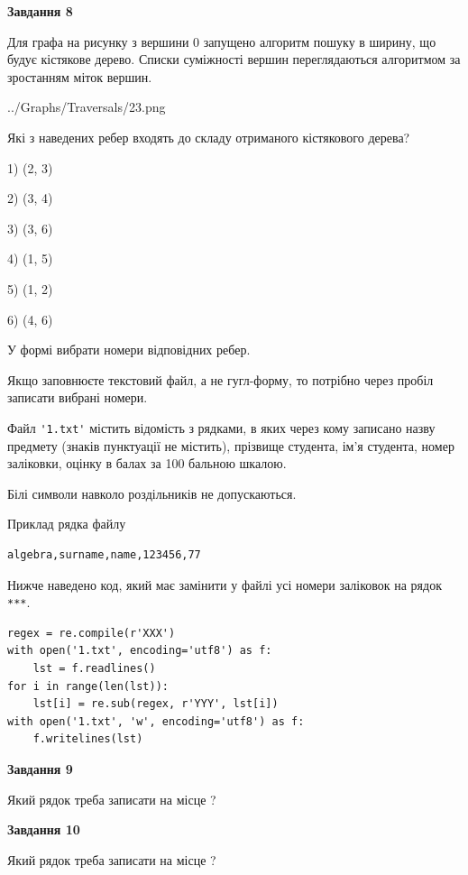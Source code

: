 \documentclass[12pt, ukrainian]{article}
\def\code#1{\Verb!#1!}
\begin{document}
{\begin {large}
{\begin {center}\textbf{Завдання 8}\end {center}}\par
Для графа на рисунку з вершини 0 запущено алгоритм пошуку в ширину, що будує кістякове дерево. Списки суміжності вершин переглядаються алгоритмом за зростанням міток вершин.\par
\begin{center}
	{../Graphs/Traversals/23.png}
\end{center}
\par Які з наведених ребер входять до складу отриманого кістякового дерева?\par
1) (2, 3)\par
2) (3, 4)\par
3) (3, 6)\par
4) (1, 5)\par
5) (1, 2)\par
6) (4, 6)\par
{\vskip 15pt} У формі вибрати номери відповідних ребер.


Якщо заповнюєте текстовий файл, а не гугл-форму, то потрібно через пробіл записа\-ти вибрані номери.\par
\newpage


Файл \code{'1.txt'} містить відомість з рядками, в яких через кому записа\-но назву предмету (знаків пунктуації не містить), прізвище студента, ім'я студента, номер залі\-ков\-ки, оцінку в балах за 100 бальною шкалою.

Білі символи навколо роздільників не допускаються.

Приклад рядка файлу



\begin{verbatim}
algebra,surname,name,123456,77
\end{verbatim}


Нижче наведено код, який має замінити у файлі усі номери заліковок на рядок \code{***}.



\begin{verbatim}
regex = re.compile(r'XXX')
with open('1.txt', encoding='utf8') as f:
    lst = f.readlines()
for i in range(len(lst)):
    lst[i] = re.sub(regex, r'YYY', lst[i])
with open('1.txt', 'w', encoding='utf8') as f:
    f.writelines(lst)
\end{verbatim}




{\begin {center}\textbf{Завдання 9}\end {center}}\par
Який рядок треба записати на місце  ?\par
\vspace{5mm}


{\begin {center}\textbf{Завдання 10}\end {center}}\par
Який рядок треба записати на місце  ?\par


\newpage


\end {large}}
\end{document}
